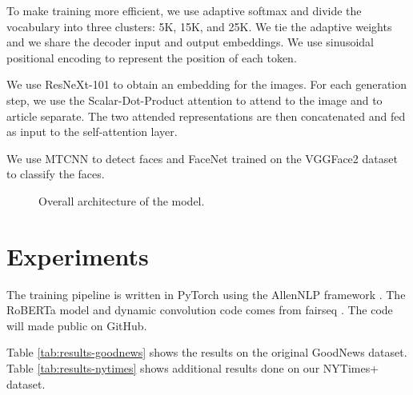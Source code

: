 \documentclass[10pt,twocolumn,letterpaper]{article}
\begin{document}
To make training more efficient, we use adaptive softmax
\cite{Grave2016EfficientSA} and divide the vocabulary into three clusters: 5K,
15K, and 25K. We tie the adaptive weights and we share the decoder input and
output embeddings. We use sinusoidal positional encoding
\cite{Vaswani2017AttentionIA} to represent the position of each token.

We use ResNeXt-101 \cite{Xie2017AggregatedRT} to obtain an embedding for
the images. For each generation step, we use the Scalar-Dot-Product attention
\cite{Vaswani2017AttentionIA} to attend to the image and to article separate.
The two attended representations are then concatenated and fed as input to
the self-attention layer.

We use MTCNN \cite{Zhang2016JointFD} to detect faces and FaceNet
\cite{Schroff2015FaceNetAU} trained on the VGGFace2 dataset
\cite{Cao2017VGGFace2AD}
to classify the faces.

\begin{figure}[t]
   \begin{center}
   \fbox{\rule{0pt}{2in} \rule{.9\linewidth}{0pt}}
   \end{center}
      \caption{Overall architecture of the model.}
   \label{fig:short}
   \end{figure}

\section{Experiments}

The training pipeline is written in PyTorch \cite{Paszke2017Automatic} using
the AllenNLP framework \cite{Gardner2017AllenNLP}. The RoBERTa model and
dynamic convolution code comes from fairseq \cite{Ott2019Fairseq}. The code
will made public on GitHub.

Table \ref{tab:results-goodnews} shows the results on the original GoodNews
dataset. Table \ref{tab:results-nytimes} shows additional results done on
our NYTimes+ dataset.
\end{document}
